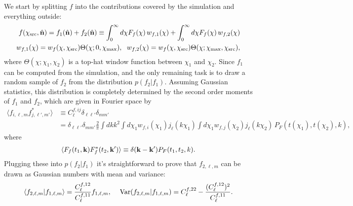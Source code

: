 \documentclass[a4paper,10pt]{article}
\newcommand{\nv}{\hat{\bf n}}
\begin{document}
  We start by splitting $f$ into the contributions covered by the simulation and everything outside:
  \begin{align}
    f(\chi_{\rm src},\nv)=f_1(\nv)+f_2(\nv)\equiv\int_0^{\infty}d\chi F_f(\chi)\,w_{f,1}(\chi)+\int_0^{\infty}d\chi F_f(\chi)\,w_{f,2}(\chi)\\
    w_{f,1}(\chi)=w_f(\chi,\chi_{\rm src})\Theta(\chi;0,\chi_{\rm max}),\hspace{6pt}
    w_{f,2}(\chi)=w_f(\chi,\chi_{\rm src})\Theta(\chi;\chi_{\rm max},\chi_{\rm src}),
  \end{align}
  where $\Theta(\chi;\chi_1,\chi_2)$ is a top-hat window function between $\chi_1$ and $\chi_2$. Since $f_1$ can be computed from the simulation, and the only remaining task is to draw a random sample of $f_2$ from the distribution $p(f_2|f_1)$. Assuming Gaussian statistics, this distribution is completely determined by the second order moments of $f_1$ and $f_2$, which are given in Fourier space by
  \begin{align}
   \langle f_{i,\ell,m}f^*_{j,\ell',m'}\rangle
   &\equiv C^{f,ij}_\ell\delta_{\ell\ell'}\delta_{mm'}\\
   &=\delta_{\ell\ell'}\delta_{mm'}\frac{2}{\pi}\int dk k^2\int d\chi_1 w_{f,i}(\chi_1)j_\ell(k\chi_1)\int d\chi_1 w_{f,j}(\chi_2)j_\ell(k\chi_2)\,P_F(t(\chi_1),t(\chi_2),k),
  \end{align}
  where
  \begin{align}
    \langle F_f(t_1,{\bf k})F^*_f(t_2,{\bf k}')\rangle\equiv\delta({\bf k}-{\bf k}')P_F(t_1,t_2,k).
  \end{align}
  Plugging these into $p(f_2|f_1)$ it's straightforward to prove that $f_{2,\ell,m}$ can be drawn as Gaussian numbers with mean and variance:
  \begin{equation}
    \langle f_{2,\ell,m}|f_{1,\ell,m}\rangle=\frac{C^{f,12}_\ell}{C^{f,11}_\ell}f_{1,\ell,m},\hspace{12pt}
    {\rm Var}(f_{2,\ell,m}|f_{1,\ell,m})=C^{f,22}_\ell-\frac{(C^{f,12}_\ell)^2}{C^{f,11}_\ell}.
  \end{equation}
\end{document}
